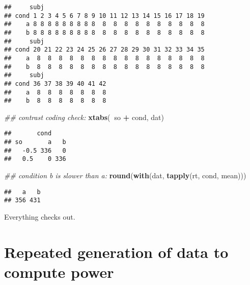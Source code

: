 \documentclass[12pt,]{krantz}
\newenvironment{Shaded}{\begin{snugshade}}{\end{snugshade}}
\newcommand{\CommentTok}[1]{\textcolor[rgb]{0.56,0.35,0.01}{\textit{#1}}}
\newcommand{\KeywordTok}[1]{\textcolor[rgb]{0.13,0.29,0.53}{\textbf{#1}}}
\newcommand{\NormalTok}[1]{#1}
\newcommand{\OperatorTok}[1]{\textcolor[rgb]{0.81,0.36,0.00}{\textbf{#1}}}
\newcommand{\StringTok}[1]{\textcolor[rgb]{0.31,0.60,0.02}{#1}}
\begin{document}
\begin{verbatim}
##     subj
## cond 1 2 3 4 5 6 7 8 9 10 11 12 13 14 15 16 17 18 19
##    a 8 8 8 8 8 8 8 8 8  8  8  8  8  8  8  8  8  8  8
##    b 8 8 8 8 8 8 8 8 8  8  8  8  8  8  8  8  8  8  8
##     subj
## cond 20 21 22 23 24 25 26 27 28 29 30 31 32 33 34 35
##    a  8  8  8  8  8  8  8  8  8  8  8  8  8  8  8  8
##    b  8  8  8  8  8  8  8  8  8  8  8  8  8  8  8  8
##     subj
## cond 36 37 38 39 40 41 42
##    a  8  8  8  8  8  8  8
##    b  8  8  8  8  8  8  8
\end{verbatim}

\begin{Shaded}
\begin{Highlighting}[]
\CommentTok{## contrast coding check:}
\KeywordTok{xtabs}\NormalTok{(}\OperatorTok{~}\NormalTok{so }\OperatorTok{+}\StringTok{ }\NormalTok{cond, dat)}
\end{Highlighting}
\end{Shaded}

\begin{verbatim}
##       cond
## so       a   b
##   -0.5 336   0
##   0.5    0 336
\end{verbatim}

\begin{Shaded}
\begin{Highlighting}[]
\CommentTok{## condition b is slower than a:}
\KeywordTok{round}\NormalTok{(}\KeywordTok{with}\NormalTok{(dat, }\KeywordTok{tapply}\NormalTok{(rt, cond, mean)))}
\end{Highlighting}
\end{Shaded}

\begin{verbatim}
##   a   b 
## 356 431
\end{verbatim}

Everything checks out.

\hypertarget{repeated-generation-of-data-to-compute-power}{%
\section{Repeated generation of data to compute power}\label{repeated-generation-of-data-to-compute-power}}
\end{document}
